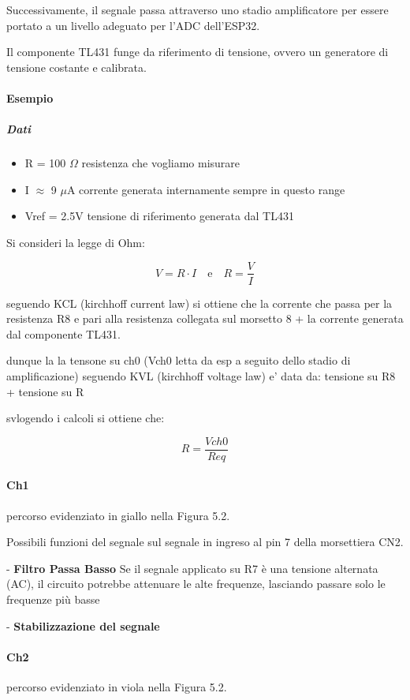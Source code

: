 \documentclass[12pt,a4paper]{report}
\begin{document}
Successivamente, il segnale passa attraverso uno stadio amplificatore per essere portato a un livello adeguato per l'ADC dell'ESP32.

Il componente TL431 funge da riferimento di tensione, ovvero un generatore di tensione costante e calibrata.

\paragraph{Esempio } 
\subparagraph{Dati}

\begin{itemize}
    \item R = 100 $\Omega$ resistenza che vogliamo misurare
    \item I $\approx$ 9 $\mu$A corrente generata internamente sempre in questo range
    \item Vref = 2.5V tensione di riferimento generata dal TL431
\end{itemize}

Si consideri la legge di Ohm:

\[ V = R \cdot I \quad \text{e} \quad R = \frac{V}{I} \]

seguendo KCL (kirchhoff current law) si ottiene che la corrente che passa per la resistenza R8 e pari alla resistenza collegata sul morsetto 8 + la corrente generata dal componente TL431.

dunque la la tensone su ch0 (Vch0 letta da esp a seguito dello stadio di amplificazione) seguendo KVL (kirchhoff voltage law) e' data da: tensione su R8 + tensione su R

svlogendo i calcoli si ottiene che:

\[ R = \frac{Vch0}{Req}  \] 

\paragraph{Ch1}
percorso evidenziato in giallo nella Figura 5.2.

Possibili funzioni del segnale sul segnale in ingreso al pin 7 della morsettiera CN2.

- \textbf{Filtro Passa Basso}
Se il segnale applicato su R7 è una tensione alternata (AC), il circuito potrebbe attenuare le alte frequenze, lasciando passare solo le frequenze più basse

- \textbf{Stabilizzazione del segnale}

\paragraph{Ch2}
percorso evidenziato in viola nella Figura 5.2.
\end{document}
